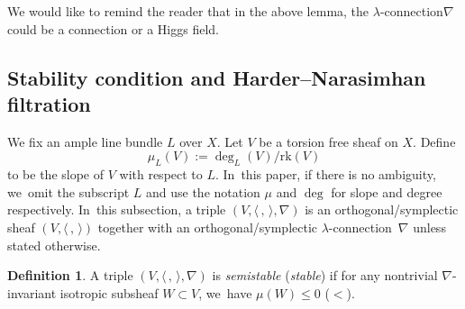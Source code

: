 \documentclass[JEP,XML,SOM,Unicode,published]{cedram}
\newcommand{\lconnection}{$\lambda$\nobreakdash-con\-nec\-tion\xspace}
\newcommand{\rk}{\mathrm{rk}}
\theoremstyle{plain}
\theoremstyle{definition}
\newtheorem{defn}[thm]{Definition}
\begin{document}
We would like to remind the reader that in the above lemma, the \lconnection $\nabla$ could be a connection or a Higgs field.

\subsection{Stability condition and Harder--Narasimhan filtration}\label{subsect_stab_cond}
We fix an ample line bundle $L$ over $X$. Let $V$ be a torsion free sheaf on $X$. Define
\[
\mu_L(V):=\deg_L(V)/\rk(V)
\]
to be the slope of $V$ with respect to $L$. In~this paper, if there is no ambiguity, we~omit the subscript $L$ and use the notation $\mu$ and $\deg$ for slope and degree respectively. In~this subsection, a triple $(V,\langle \,, \, \rangle,\nabla)$ is an orthogonal/symplectic sheaf $(V,\langle \,, \, \rangle)$ together with an orthogonal/symplectic \lconnection~$\nabla$ unless stated otherwise.

\begin{defn}\label{defn_stab}
A triple $(V,\langle \,, \, \rangle,\nabla)$ is \emph{semistable} (\resp \emph{stable}) if for any nontrivial $\nabla$-invariant isotropic subsheaf $W \subset V$, we~have $\mu(W)\leqslant 0$ (\resp $<$).
\end{defn}
\end{document}
